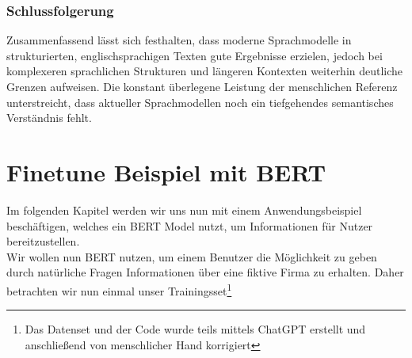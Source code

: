 \documentclass[a4paper, 11pt]{article}          %
\begin{document}
\subsubsection{Schlussfolgerung} 
Zusammenfassend lässt sich festhalten, dass moderne Sprachmodelle in strukturierten, englischsprachigen Texten gute Ergebnisse erzielen,
 jedoch bei komplexeren sprachlichen Strukturen und längeren Kontexten weiterhin deutliche Grenzen aufweisen. 
Die konstant überlegene Leistung der menschlichen Referenz unterstreicht, dass aktueller Sprachmodellen noch ein tiefgehendes semantisches Verständnis fehlt. 




\newpage
\section{Finetune Beispiel mit BERT}
\label{sec:finetune}
Im folgenden Kapitel werden wir uns nun mit einem Anwendungsbeispiel beschäftigen, welches ein BERT Model nutzt, um Informationen für Nutzer bereitzustellen.
\medskip \\
Wir wollen nun BERT nutzen, um einem Benutzer die Möglichkeit zu geben durch natürliche Fragen Informationen über eine fiktive Firma zu erhalten. Daher betrachten wir nun einmal unser Trainingsset\footnote{Das Datenset und der Code wurde teils mittels ChatGPT erstellt und anschließend von menschlicher Hand korrigiert}
\end{document}
